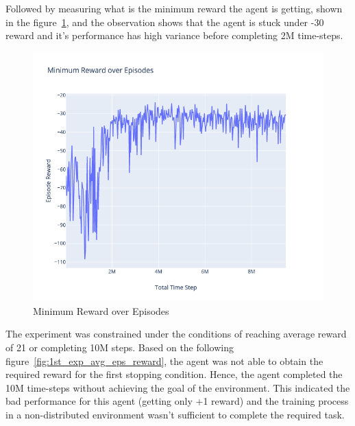 Followed by measuring what is the minimum reward the agent is getting, shown in the figure~\ref{fig:1st_exp_min_eps_reward}, and the observation shows that the agent is stuck under -30 reward and it's performance has high variance before completing 2M time-steps.
\begin{figure}[H]
	\centering
	\includegraphics[width=\linewidth]{figures/exps/1st_exp/min_eps_reward}
	\caption{Minimum Reward over Episodes}
	\label{fig:1st_exp_min_eps_reward}
\end{figure}
The experiment was constrained under the conditions of reaching average reward of 21 or completing 10M steps. Based on the following figure~\ref{fig:1st_exp_avg_eps_reward}, the agent was not able to obtain the required reward for the first stopping condition. Hence, the agent completed the 10M time-steps without achieving the goal of the environment. This indicated the bad performance for this agent (getting only +1 reward) and the training process in a non-distributed environment wasn't sufficient to complete the required task.
